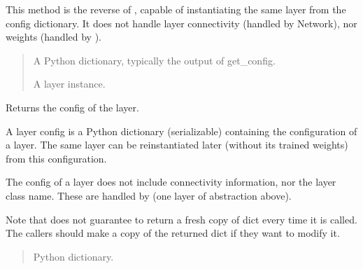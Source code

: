 \documentclass[letterpaper,10pt,english]{sphinxmanual}
\begin{document}
\begin{fulllineitems}
\begin{fulllineitems}
\sphinxAtStartPar
This method is the reverse of ,
capable of instantiating the same layer from the config
dictionary. It does not handle layer connectivity
(handled by Network), nor weights (handled by ).
\begin{quote}\begin{description}
\sphinxAtStartPar
{} \textendash{} A Python dictionary, typically the
output of get\_config.

\sphinxAtStartPar
A layer instance.

\end{description}\end{quote}

\end{fulllineitems}


\begin{fulllineitems}
\label{\detokenize{beyondml.tflow.layers:beyondml.tflow.layers.MultiMaxPool3D.MultiMaxPool3D.get_config}}
\pysigstartsignatures
{}
\pysigstopsignatures
\sphinxAtStartPar
Returns the config of the layer.

\sphinxAtStartPar
A layer config is a Python dictionary (serializable)
containing the configuration of a layer.
The same layer can be reinstantiated later
(without its trained weights) from this configuration.

\sphinxAtStartPar
The config of a layer does not include connectivity
information, nor the layer class name. These are handled
by  (one layer of abstraction above).

\sphinxAtStartPar
Note that  does not guarantee to return a fresh copy of
dict every time it is called. The callers should make a copy of the
returned dict if they want to modify it.
\begin{quote}\begin{description}
\sphinxAtStartPar
Python dictionary.

\end{description}\end{quote}

\end{fulllineitems}


\end{fulllineitems}
\end{document}
